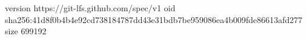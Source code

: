 version https://git-lfs.github.com/spec/v1
oid sha256:41d8f0b4b4e92cd738184787dd43e31bdb7be959086ea4b009fde86613afd277
size 699192
